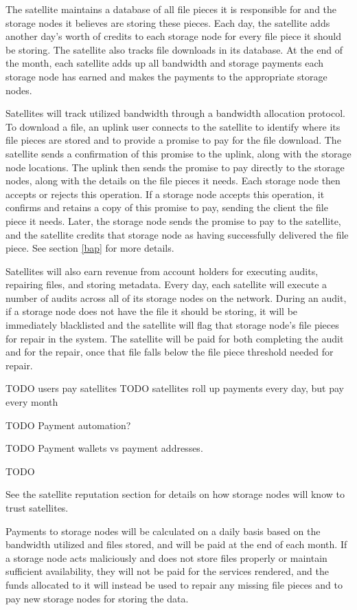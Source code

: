 \documentclass[11pt,fleqn,openany]{book}
\newcommand{\todo}[1]{{\color{red} TODO #1 }}
\begin{document}
The satellite maintains a database of all file pieces it is responsible for
and the storage nodes it believes are storing these pieces. Each day,
the satellite adds another day's worth
of credits to each storage node for every file
piece
it should be storing. The satellite
also tracks file downloads in its database.
At the end of the month, each satellite
adds up all bandwidth and storage payments each storage node has earned and
makes
the payments to the appropriate storage nodes.

Satellites will track utilized bandwidth through a bandwidth allocation
protocol. To download a file, an uplink user connects to the satellite to
identify where its file pieces are stored and to provide a promise to pay for
the file download. The satellite sends a confirmation of this promise
to the uplink, along with the storage node locations.
The uplink then sends the promise to pay directly
to the storage nodes, along with the details on the file pieces it needs.
Each storage node then accepts or rejects this operation.
If a storage node accepts this
operation, it confirms and retains a copy of this promise to pay, sending the
client the file piece it needs. Later, the storage node sends the promise to
pay to
the satellite, and the satellite credits that storage node as having
successfully delivered the file piece. See section \ref{bap} for more details.

Satellites will also earn revenue from account holders for executing audits,
repairing files, and storing metadata. Every day, each satellite will execute
a number of audits across all of its storage nodes on the network. During an
audit,
if a storage node does not have the file it should be storing, it will be
immediately
blacklisted and the satellite will flag that storage node's file pieces for
repair
in the system.
The satellite will be paid for both completing the audit
and for the repair,
once that file falls below the file piece threshold needed for
repair.

\todo{users pay satellites}
\todo{satellites roll up payments every day, but pay every month}

\todo{Payment automation?}

\todo{Payment wallets vs payment addresses. }

\todo{}

See the satellite reputation section for details on
how storage nodes will know to trust satellites.

Payments to storage nodes will be calculated on a daily basis based on the
bandwidth
utilized and files stored, and will be paid at the end of each month.
If a storage node acts
maliciously and does not store files properly or maintain sufficient
availability, they will not be paid for the services rendered, and the funds
allocated to it will instead be used to repair any missing
file pieces and to pay new storage nodes for storing the data.
\end{document}
